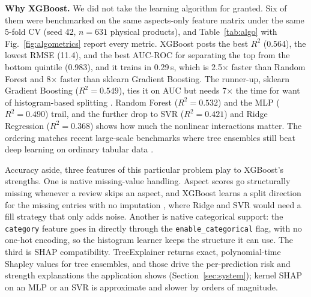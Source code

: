 \documentclass[journal]{IEEEtran}
\begin{document}
\textbf{Why XGBoost.} We did not take the learning algorithm for granted. Six of them were benchmarked on the same aspects-only feature matrix under the same 5-fold CV (seed 42, $n = 631$ physical products), and Table~\ref{tab:algo} with Fig.~\ref{fig:algometrics} report every metric. XGBoost posts the best $R^2$ (0.564), the lowest RMSE (11.4), and the best AUC-ROC for separating the top from the bottom quintile (0.983), and it trains in 0.29\,s, which is 2.5$\times$ faster than Random Forest and 8$\times$ faster than sklearn Gradient Boosting. The runner-up, sklearn Gradient Boosting ($R^2 = 0.549$), ties it on AUC but needs 7$\times$ the time for want of histogram-based splitting \cite{ke2017lightgbm}. Random Forest \cite{breiman2001random} ($R^2 = 0.532$) and the MLP ($R^2 = 0.490$) trail, and the further drop to SVR \cite{cortes1995svm} ($R^2 = 0.421$) and Ridge Regression \cite{hoerl1970ridge} ($R^2 = 0.368$) shows how much the nonlinear interactions matter. The ordering matches recent large-scale benchmarks where tree ensembles still beat deep learning on ordinary tabular data \cite{grinsztajn2022tree,shwartzziv2022tabular}.

Accuracy aside, three features of this particular problem play to XGBoost's strengths. One is native missing-value handling. Aspect scores go structurally missing whenever a review skips an aspect, and XGBoost learns a split direction for the missing entries with no imputation \cite{chen2016xgboost}, where Ridge and SVR would need a fill strategy that only adds noise. Another is native categorical support: the \texttt{category} feature goes in directly through the \texttt{enable\_categorical} flag, with no one-hot encoding, so the histogram learner keeps the structure it can use. The third is SHAP compatibility. TreeExplainer \cite{lundberg2017shap} returns exact, polynomial-time Shapley values for tree ensembles, and those drive the per-prediction risk and strength explanations the application shows (Section~\ref{sec:system}); kernel SHAP on an MLP or an SVR is approximate and slower by orders of magnitude.
\end{document}
